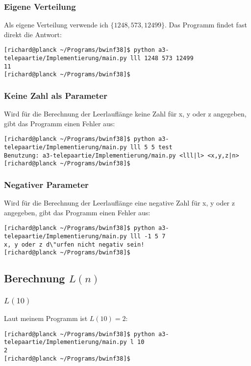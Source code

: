 \documentclass[a4paper,10pt,ngerman]{scrartcl}
\begin{document}
\subsubsection{Eigene Verteilung}
Als eigene Verteilung verwende ich $\{1248, 573, 12499\}$.
Das Programm findet fast direkt die Antwort:
\begin{lstlisting}
[richard@planck ~/Programs/bwinf38]$ python a3-telepaartie/Implementierung/main.py lll 1248 573 12499
11
[richard@planck ~/Programs/bwinf38]$ 
\end{lstlisting}

\subsubsection{Keine Zahl als Parameter}
Wird für die Berechnung der Leerlauflänge keine Zahl für x, y oder z angegeben, gibt das Programm einen Fehler aus:
\begin{lstlisting}
[richard@planck ~/Programs/bwinf38]$ python a3-telepaartie/Implementierung/main.py lll 5 5 test
Benutzung: a3-telepaartie/Implementierung/main.py <lll|l> <x,y,z|n>
[richard@planck ~/Programs/bwinf38]$ 
\end{lstlisting}

\subsubsection{Negativer Parameter}
Wird für die Berechnung der Leerlauflänge eine negative Zahl für x, y oder z angegeben, gibt das Programm einen Fehler aus:
\begin{lstlisting}
[richard@planck ~/Programs/bwinf38]$ python a3-telepaartie/Implementierung/main.py lll -1 5 7
x, y oder z d\"urfen nicht negativ sein!
[richard@planck ~/Programs/bwinf38]$
\end{lstlisting}

\subsection{Berechnung $L(n)$}
\subsubsection{$L(10)$}
Laut meinem Programm ist $L(10) = 2$:
\begin{lstlisting}
[richard@planck ~/Programs/bwinf38]$ python a3-telepaartie/Implementierung/main.py l 10
2
[richard@planck ~/Programs/bwinf38]$ 
\end{lstlisting}
\end{document}
